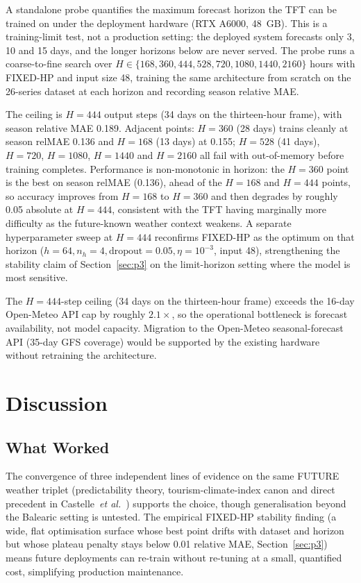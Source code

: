 \documentclass[twocolumn,twoside,a4paper,10pt]{IEEEtran}
\begin{document}
A standalone probe quantifies the maximum forecast horizon the TFT can be trained on under the deployment hardware (RTX A6000, 48~GB). This is a training-limit test, not a production setting: the deployed system forecasts only 3, 10 and 15 days, and the longer horizons below are never served. The probe runs a coarse-to-fine search over $H \in \{168, 360, 444, 528, 720, 1080, 1440, 2160\}$ hours with FIXED-HP and input size 48, training the same architecture from scratch on the 26-series dataset at each horizon and recording season relative MAE.

The ceiling is $H{=}444$ output steps (34 days on the thirteen-hour frame), with season relative MAE 0.189. Adjacent points: $H{=}360$ (28 days) trains cleanly at season relMAE 0.136 and $H{=}168$ (13 days) at 0.155; $H{=}528$ (41 days), $H{=}720$, $H{=}1080$, $H{=}1440$ and $H{=}2160$ all fail with out-of-memory before training completes. Performance is non-monotonic in horizon: the $H{=}360$ point is the best on season relMAE (0.136), ahead of the $H{=}168$ and $H{=}444$ points, so accuracy improves from $H{=}168$ to $H{=}360$ and then degrades by roughly 0.05 absolute at $H{=}444$, consistent with the TFT having marginally more difficulty as the future-known weather context weakens. A separate hyperparameter sweep at $H{=}444$ reconfirms FIXED-HP as the optimum on that horizon ($h{=}64, n_h{=}4, \text{dropout}{=}0.05, \eta{=}10^{-3}$, input 48), strengthening the stability claim of Section~\ref{sec:p3} on the limit-horizon setting where the model is most sensitive.

The $H{=}444$-step ceiling (34 days on the thirteen-hour frame) exceeds the 16-day Open-Meteo API cap by roughly $2.1\times$, so the operational bottleneck is forecast availability, not model capacity. Migration to the Open-Meteo seasonal-forecast API (35-day GFS coverage) would be supported by the existing hardware without retraining the architecture.

\section{Discussion}

\subsection{What Worked}

The convergence of three independent lines of evidence on the same FUTURE weather triplet (predictability theory, tourism-climate-index canon and direct precedent in Castelle~\emph{et al.}~\cite{Castelle2025}) supports the choice, though generalisation beyond the Balearic setting is untested. The empirical FIXED-HP stability finding (a wide, flat optimisation surface whose best point drifts with dataset and horizon but whose plateau penalty stays below 0.01 relative MAE, Section~\ref{sec:p3}) means future deployments can re-train without re-tuning at a small, quantified cost, simplifying production maintenance.
\end{document}
